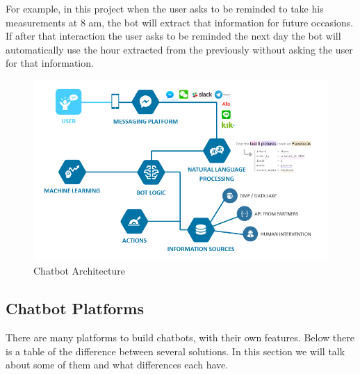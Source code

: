 For example, in this project when the user asks to be reminded to take his measurements at 8 am, the bot will extract that information for future occasions. If after that interaction the user asks to be reminded the next day the bot will automatically use the hour extracted from the previously without asking the user for that information.\\

\begin{center}
	\begin{figure}[h!]
		\centering
		\includegraphics[scale=0.6]{./images/3-cha-struct}
		\caption{Chatbot Architecture}
		\label{cha_struct}
	\end{figure}
\end{center}

\subsection{Chatbot Platforms}\label{sec:chap3_plat}

There are many platforms to build chatbots, with their own features. Below there is a table of the difference between several solutions. In this section we will talk about some of them and what differences each have.\\



